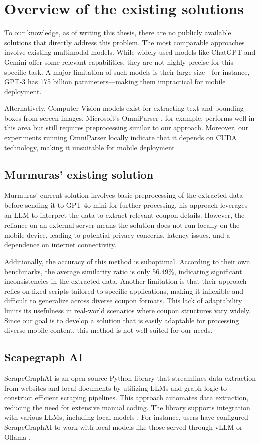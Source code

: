 \documentclass[licencjacka,en]{docs/pracamgr}
\begin{document}
\chapter{Overview of the existing solutions}
To our knowledge, as of writing this thesis, there are no publicly available solutions that directly address this problem. The most comparable approaches involve existing multimodal models. While widely used models like ChatGPT and Gemini offer some relevant capabilities, they are not highly precise for this specific task. A major limitation of such models is their large size—for instance, GPT-3 has 175 billion parameters\cite{chatgpt_params}—making them impractical for mobile deployment.

Alternatively, Computer Vision models exist for extracting text and bounding boxes from screen images. Microsoft’s OmniParser \cite{omniparser_intro}, for example, performs well in this area but still requires preprocessing similar to our approach. Moreover, our experiments running OmniParser locally indicate that it depends on CUDA technology, making it unsuitable for mobile deployment \cite{OUR EXPERIMENTS???}.



\section{Murmuras' existing solution} 
Murmuras’ current solution involves basic preprocessing of the extracted data before sending it to GPT-4o-mini for further processing. his approach leverages an LLM to interpret the data to extract relevant coupon details. However, the reliance on an external server means the solution does not run locally on the mobile device, leading to potential privacy concerns, latency issues, and a dependence on internet connectivity. 

Additionally, the accuracy of this method is suboptimal. According to their own benchmarks, the average similarity ratio is only 56.49\%, indicating significant inconsistencies in the extracted data. Another limitation is that their approach relies on fixed scripts tailored to specific applications, making it inflexible and difficult to generalize across diverse coupon formats. This lack of adaptability limits its usefulness in real-world scenarios where coupon structures vary widely. Since our goal is to develop a solution that is easily adaptable for processing diverse mobile content, this method is not well-suited for our needs.


\section{Scapegraph AI}
ScrapeGraphAI is an open-source Python library that streamlines data extraction from websites and local documents by utilizing LLMs and graph logic to construct efficient scraping pipelines. This approach automates data extraction, reducing the need for extensive manual coding. The library supports integration with various LLMs, including local models \cite{scapegraph_intro}. For instance, users have configured ScrapeGraphAI to work with local models like those served through vLLM \cite{gh_issue_810_scapegraph} or Ollama \cite{gh_issue_752_scapegraph}.
\end{document}
